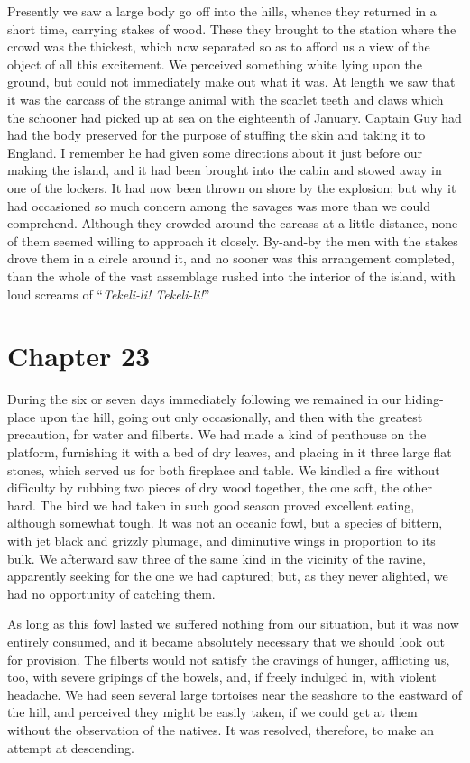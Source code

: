 Presently we saw a large body go off into the hills, whence they returned in
a short time, carrying stakes of wood. These they brought to the station where
the crowd was the thickest, which now separated so as to afford us a view of the
object of all this excitement. We perceived something white lying upon the
ground, but could not immediately make out what it was. At length we saw that it
was the carcass of the strange animal with the scarlet teeth and claws which the
schooner had picked up at sea on the eighteenth of January. Captain Guy had had
the body preserved for the purpose of stuffing the skin and taking it to
England. I remember he had given some directions about it just before our making
the island, and it had been brought into the cabin and stowed away in one of the
lockers. It had now been thrown on shore by the explosion; but why it had
occasioned so much concern among the savages was more than we could comprehend.
Although they crowded around the carcass at a little distance, none of them
seemed willing to approach it closely. By-and-by the men with the stakes drove
them in a circle around it, and no sooner was this arrangement completed, than
the whole of the vast assemblage rushed into the interior of the island, with
loud screams of ``\emph{Tekeli-li! Tekeli-li!}'' 

\section{Chapter 23}
During the six or seven days immediately following we remained in our
hiding-place upon the hill, going out only occasionally, and then with the
greatest precaution, for water and filberts. We had made a kind of penthouse on
the platform, furnishing it with a bed of dry leaves, and placing in it three
large flat stones, which served us for both fireplace and table. We kindled a
fire without difficulty by rubbing two pieces of dry wood together, the one
soft, the other hard. The bird we had taken in such good season proved excellent
eating, although somewhat tough. It was not an oceanic fowl, but a species of
bittern, with jet black and grizzly plumage, and diminutive wings in proportion
to its bulk. We afterward saw three of the same kind in the vicinity of the
ravine, apparently seeking for the one we had captured; but, as they never
alighted, we had no opportunity of catching them. 

As long as this fowl lasted we suffered nothing from our situation, but it
was now entirely consumed, and it became absolutely necessary that we should
look out for provision. The filberts would not satisfy the cravings of hunger,
afflicting us, too, with severe gripings of the bowels, and, if freely indulged
in, with violent headache. We had seen several large tortoises near the seashore
to the eastward of the hill, and perceived they might be easily taken, if we
could get at them without the observation of the natives. It was resolved,
therefore, to make an attempt at descending. 

